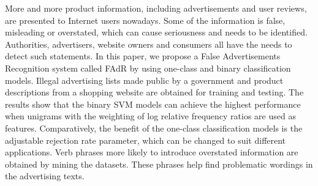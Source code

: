 More and more product information, including advertisements and user reviews, are presented to Internet users nowadays. Some of the information is false, misleading or overstated, which can cause seriousness and needs to be identified. Authorities, advertisers, website owners and consumers all have the needs to detect such statements. In this paper, we propose a False Advertisements Recognition system called FAdR by using one-class and binary classification models. Illegal advertising lists made public by a government and product descriptions from a shopping website are obtained for training and testing. The results show that the binary SVM models can achieve the highest performance when unigrams with the weighting of log relative frequency ratios are used as features. Comparatively, the benefit of the one-class classification models is the adjustable rejection rate parameter, which can be changed to suit different applications. Verb phrases more likely to introduce overstated information are obtained by mining the datasets. These phrases help find problematic wordings in the advertising texts.
